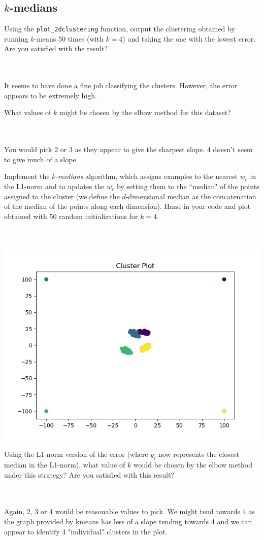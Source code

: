 \documentclass{article}
\def\blu#1{{\color{blu}#1}}
\def\enum#1{\begin{enumerate}#1\end{enumerate}}
\begin{document}
\subsection{$k$-medians}

 \enum{
 \blu{\item Using the \texttt{plot\_2dclustering} function, output the clustering obtained by running $k$-means 50 times (with $k=4$)  and taking the one with the lowest error. Are you satisfied with the result?}\\\\ It seems to have done a fine job classifying the clusters. However, the error appears to be extremely high.
 \blu{\item What values of $k$ might be chosen by the elbow method for this dataset?} \\\\ You would pick 2 or 3 as they appear to give the sharpest slope. 4 doesn't seem to give much of a slope.
 \blu{\item Implement the $k$-\emph{medians} algorithm, which assigns examples to the nearest $w_c$ in the L1-norm and to updates the $w_c$ by setting them to the ``median" of the points assigned to the cluster (we define the $d$-dimensional median as the concatenation of the median of the points along each dimension). Hand in your code and plot obtained with 50 random initializations for $k = 4$.} \\\\ \includegraphics{../figs/kmeans_3_3}
\blu{\item Using the L1-norm version of the error (where $y_i$ now represents the closest median in the L1-norm),
what value of $k$ would be chosen by the elbow method under this strategy? Are you satisfied with this result?} \\\\ Again, 2, 3 or 4 would be reasonable values to pick. We might tend towards 4 as the graph provided by kmeans has less of a slope tending towards 4 and we can appear to identify 4 "individual" clusters in the plot.
}
\end{document}
